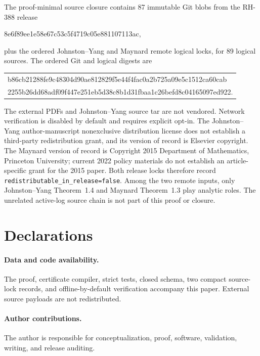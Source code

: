 \documentclass[11pt]{article}
\theoremstyle{definition}
\theoremstyle{remark}
\begin{document}
The proof-minimal source closure contains 87 immutable Git blobs from
the RH-388 release
\begin{center}
\small\ttfamily
8e6f89ee1e58e67c53c5f4719c05e881107113ac,
\end{center}
plus the ordered Johnston--Yang and Maynard remote logical locks, for 89
logical sources.  The ordered Git and logical digests are
\begin{center}
\small\ttfamily
\begin{tabular}{@{}l@{}}
b86cb21288fe9c48304d90ae812829f5e44f4fac0a2b725a09e5c1512ca60cab\\
2255b26dd68adf09f447e251eb5d38c8b1d31fbaa1c26befd8c04165097ed922.
\end{tabular}
\end{center}
The external PDFs and Johnston--Yang source tar are not vendored.
Network verification is disabled by default and requires explicit
opt-in.  The Johnston--Yang author-manuscript nonexclusive distribution
license does not establish a third-party redistribution grant, and its
version of record is Elsevier copyright.  The Maynard version of record
is Copyright 2015 Department of Mathematics, Princeton University;
current 2022 policy materials do not establish an article-specific grant
for the 2015 paper.  Both release locks therefore record
\texttt{redistributable\_in\_release=false}.  Among the two remote
inputs, only Johnston--Yang Theorem~1.4 and Maynard Theorem~1.3 play
analytic roles.  The unrelated active-log source chain is not part of
this proof or closure.

\section*{Declarations}

\paragraph{Data and code availability.}
The proof, certificate compiler, strict tests, closed schema, two compact
source-lock records, and offline-by-default verification accompany this
paper.  External source payloads are not redistributed.

\paragraph{Author contributions.}
The author is responsible for conceptualization, proof, software,
validation, writing, and release auditing.
\end{document}
